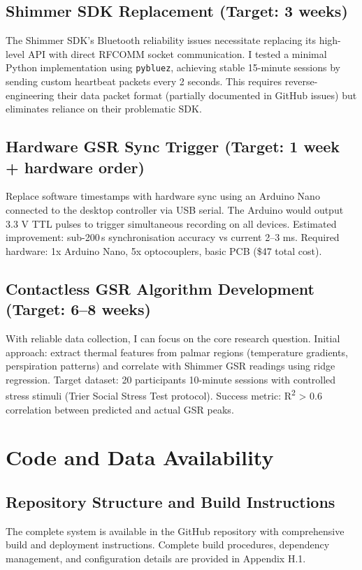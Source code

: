 \subsection{Shimmer SDK Replacement (Target: 3 weeks)}
The Shimmer SDK's Bluetooth reliability issues necessitate replacing its high-level API with direct RFCOMM socket communication. I tested a minimal Python implementation using \texttt{pybluez}, achieving stable 15-minute sessions by sending custom heartbeat packets every 2 seconds. This requires reverse-engineering their data packet format (partially documented in GitHub issues) but eliminates reliance on their problematic SDK.

\subsection{Hardware GSR Sync Trigger (Target: 1 week + hardware order)}
Replace software timestamps with hardware sync using an Arduino Nano connected to the desktop controller via USB serial. The Arduino would output 3.3 V TTL pulses to trigger simultaneous recording on all devices. Estimated improvement: sub-200\,\textmu s synchronisation accuracy vs current 2--3 ms. Required hardware: 1x Arduino Nano, 5x optocouplers, basic PCB (\$47 total cost).

\subsection{Contactless GSR Algorithm Development (Target: 6--8 weeks)}
With reliable data collection, I can focus on the core research question. Initial approach: extract thermal features from palmar regions (temperature gradients, perspiration patterns) and correlate with Shimmer GSR readings using ridge regression. Target dataset: 20 participants \texttimes{} 10-minute sessions with controlled stress stimuli (Trier Social Stress Test protocol). Success metric: R\textsuperscript{2} \textgreater{} 0.6 correlation between predicted and actual GSR peaks.


\section{Code and Data Availability}

\subsection{Repository Structure and Build Instructions}
The complete system is available in the GitHub repository with comprehensive build and deployment instructions. Complete build procedures, dependency management, and configuration details are provided in Appendix H.1.

